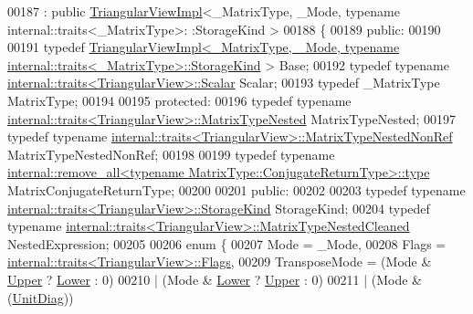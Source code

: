\begin{DoxyCode}
00187   : \textcolor{keyword}{public} \hyperlink{class_eigen_1_1_triangular_view_impl}{TriangularViewImpl}<\_MatrixType, \_Mode, typename internal::traits<\_MatrixType>:
      :StorageKind >
00188 \{
00189   \textcolor{keyword}{public}:
00190 
00191     \textcolor{keyword}{typedef} 
      \hyperlink{class_eigen_1_1_triangular_view_impl}{TriangularViewImpl<\_MatrixType, \_Mode, typename internal::traits<\_MatrixType>::StorageKind}
       > Base;
00192     \textcolor{keyword}{typedef} \textcolor{keyword}{typename} \hyperlink{struct_eigen_1_1internal_1_1traits}{internal::traits<TriangularView>::Scalar} 
      Scalar;
00193     \textcolor{keyword}{typedef} \_MatrixType MatrixType;
00194 
00195   \textcolor{keyword}{protected}:
00196     \textcolor{keyword}{typedef} \textcolor{keyword}{typename} \hyperlink{struct_eigen_1_1internal_1_1traits}{internal::traits<TriangularView>::MatrixTypeNested}
       MatrixTypeNested;
00197     \textcolor{keyword}{typedef} \textcolor{keyword}{typename} \hyperlink{struct_eigen_1_1internal_1_1traits}{internal::traits<TriangularView>::MatrixTypeNestedNonRef}
       MatrixTypeNestedNonRef;
00198 
00199     \textcolor{keyword}{typedef} \textcolor{keyword}{typename} 
      \hyperlink{group___sparse_core___module}{internal::remove\_all<typename MatrixType::ConjugateReturnType>::type}
       MatrixConjugateReturnType;
00200     
00201   \textcolor{keyword}{public}:
00202 
00203     \textcolor{keyword}{typedef} \textcolor{keyword}{typename} \hyperlink{struct_eigen_1_1internal_1_1traits}{internal::traits<TriangularView>::StorageKind}
       StorageKind;
00204     \textcolor{keyword}{typedef} \textcolor{keyword}{typename} \hyperlink{struct_eigen_1_1internal_1_1traits}{internal::traits<TriangularView>::MatrixTypeNestedCleaned}
       NestedExpression;
00205 
00206     \textcolor{keyword}{enum} \{
00207       Mode = \_Mode,
00208       Flags = \hyperlink{struct_eigen_1_1internal_1_1traits}{internal::traits<TriangularView>::Flags},
00209       TransposeMode = (Mode & \hyperlink{group__enums_gga39e3366ff5554d731e7dc8bb642f83cda6bcb58be3b8b8ec84859ce0c5ac0aaec}{Upper} ? \hyperlink{group__enums_gga39e3366ff5554d731e7dc8bb642f83cda891792b8ed394f7607ab16dd716f60e6}{Lower} : 0)
00210                     | (Mode & \hyperlink{group__enums_gga39e3366ff5554d731e7dc8bb642f83cda891792b8ed394f7607ab16dd716f60e6}{Lower} ? \hyperlink{group__enums_gga39e3366ff5554d731e7dc8bb642f83cda6bcb58be3b8b8ec84859ce0c5ac0aaec}{Upper} : 0)
00211                     | (Mode & (\hyperlink{group__enums_gga39e3366ff5554d731e7dc8bb642f83cdaddb72f888ac85d5a1c52333e54f9374b}{UnitDiag}))

\end{DoxyCode}
